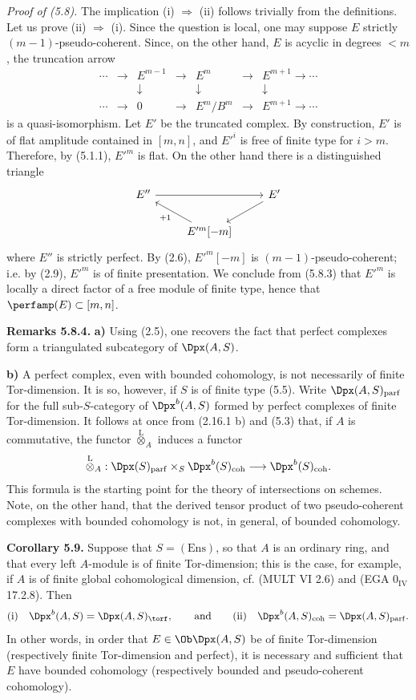 \documentclass[11pt]{article}
\begin{document}
\emph{Proof of (5.8).} The implication (i) \(\Rightarrow\) (ii) follows trivially from the definitions. Let us prove (ii) \(\Rightarrow\) (i). Since the question is local, one may suppose \(E\) strictly \((m-1)\)-pseudo-coherent. Since, on the other hand, \(E\) is acyclic in degrees \(<m\), the truncation arrow
\[
\begin{array}{ccccccc}
\cdots&\to&E^{m-1}&\to&E^m&\to&E^{m+1}\to\cdots\\
&&\downarrow&&\downarrow&&\downarrow\\
\cdots&\to&0&\to&E^m/B^m&\to&E^{m+1}\to\cdots
\end{array}
\]
is a quasi-isomorphism. Let \(E'\) be the truncated complex. By construction, \(E'\) is of flat amplitude contained in \([m,n]\), and \(E'^i\) is free of finite type for \(i>m\). Therefore, by (5.1.1), \(E'^m\) is flat. On the other hand there is a distinguished triangle
\[
\begin{tikzcd}
E'' \arrow[rr] && E' \arrow[dl]\\
& E'^m[-m] \arrow[ul,"+1"] &
\end{tikzcd}
\]
where \(E''\) is strictly perfect. By (2.6), \(E'^m[-m]\) is \((m-1)\)-pseudo-coherent; i.e. by (2.9), \(E'^m\) is of finite presentation. We conclude from (5.8.3) that \(E'^m\) is locally a direct factor of a free module of finite type, hence that \(\perfamp(E)\subset[m,n]\).

\textbf{Remarks 5.8.4.} \textbf{a)} Using (2.5), one recovers the fact that perfect complexes form a triangulated subcategory of \(\Dpx(A,S)\).

\textbf{b)} A perfect complex, even with bounded cohomology, is not necessarily of finite Tor-dimension. It is so, however, if \(S\) is of finite type (5.5). Write \(\Dpx(A,S)_{\mathrm{parf}}\) for the full sub-\(S\)-category of \(\Dpx^b(A,S)\) formed by perfect complexes of finite Tor-dimension. It follows at once from (2.16.1 b) and (5.3) that, if \(A\) is commutative, the functor \(\overset{\mathrm L}{\otimes}_A\) induces a functor
\[
  \overset{\mathrm L}{\otimes}_A:
  \Dpx(S)_{\mathrm{parf}}\times_S \Dpx^b(S)_{\mathrm{coh}}
  \longrightarrow \Dpx^b(S)_{\mathrm{coh}}.
\]
This formula is the starting point for the theory of intersections on schemes. Note, on the other hand, that the derived tensor product of two pseudo-coherent complexes with bounded cohomology is not, in general, of bounded cohomology.

\textbf{Corollary 5.9.} Suppose that \(S=(\mathrm{Ens})\), so that \(A\) is an ordinary ring, and that every left \(A\)-module is of finite Tor-dimension; this is the case, for example, if \(A\) is of finite global cohomological dimension, cf. (MULT VI 2.6) and (EGA \(0_{\mathrm{IV}}\) 17.2.8). Then
\[
\text{(i)}\quad \Dpx^b(A,S)=\Dpx(A,S)_{\torf},
\qquad
\text{and}
\qquad
\text{(ii)}\quad \Dpx^b(A,S)_{\mathrm{coh}}=\Dpx(A,S)_{\mathrm{parf}}.
\]
In other words, in order that \(E\in\Ob\Dpx(A,S)\) be of finite Tor-dimension (respectively finite Tor-dimension and perfect), it is necessary and sufficient that \(E\) have bounded cohomology (respectively bounded and pseudo-coherent cohomology).
\end{document}
